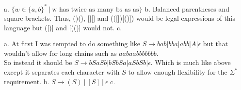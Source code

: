 




\homeworkheader{\classnameandsection}

\begin{problem}{1}
  a. $\{w \in \{a,b\}^*\ |\ \text{w has twice as many bs as as} \}$
  \br
  b. Balanced parentheses and square brackets. Thus, ()(), [][] and (([])[()]) would be legal expressions of this
     language but ([)] and [(()] would not.
  \br
  c.
  \begin{solution}
    a. At first I was tempted to do something like $S \rightarrow bab | bba | abb | A | \epsilon$ but that wouldn't
    allow for long chains such as $aabaabbbbbbb$. \\ So instead it should be $S \rightarrow bSaSb | bSbSa |
    aSbSb|\epsilon$. Which is much like above except it separates each character with $S$ to allow enough flexibility
    for the $\Sigma^*$ requirement.
    \br
    b. $S \rightarrow (S)\ |\ [S]\ |\ \epsilon$
    \br
    c.
  \end{solution}
\end{problem}

